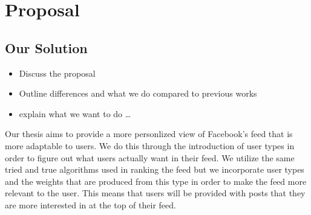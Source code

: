 \chapter{Proposal}\label{ch:proposal}


\section{Our Solution}

\begin{itemize}
  \item Discuss the proposal
  \item Outline differences and what we do compared to previous works
  \item explain what we want to do
\ldots
\end{itemize}

Our thesis aims to provide a more personlized view of Facebook's feed that is more adaptable to users. We do this through the introduction of user types in order to figure out what users actually want in their feed. We utilize the same tried and true algorithms used in ranking the feed but we incorporate user types and the weights that are produced from this type in order to make the feed more relevant to the user. This means that users will be provided with posts that they are more interested in at the top of their feed. 



